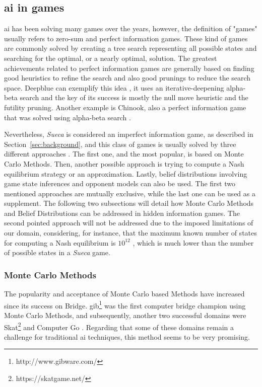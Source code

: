 \subsection{\gls{ai} in games}
 
\gls{ai} has been solving many games over the years, however, the definition of "games" usually refers to zero-sum and perfect information games.
These kind of games are commonly solved by creating a tree search representing all possible states and searching for the optimal, or a nearly optimal, solution.
The greatest achievements related to perfect information games are generally based on finding good heuristics to refine the search and also good prunings to reduce the search space.
Deepblue can exemplify this idea \cite{Campbell2002}, it uses an iterative-deepening alpha-beta search and the key of its success is mostly the null move heuristic and the futility pruning.
Another example is Chinook, also a perfect information game that was solved using alpha-beta search \cite{Schaeffer1996}.

Nevertheless, \emph{Sueca} is considered an imperfect information game, as described in Section~\ref{sec:background}, and this class of games is usually solved by three different approaches \cite{Cowling2012}.
The first one, and the most popular, is based on Monte Carlo Methods.
Then, another possible approach is trying to compute a Nash equilibrium strategy or an approximation.
Lastly, belief distributions involving game state inferences and opponent models can also be used.
The first two mentioned approaches are mutually exclusive, while the last one can be used as a supplement.
The following two subsections will detail how Monte Carlo Methods and Belief Distributions can be addressed in hidden information games.
The second pointed approach will not be addressed due to the imposed limitations of our domain, considering, for instance, that the maximum known number of states for computing a Nash equilibrium is $10^{12}$ \cite{Zinkevich}, which is much lower than the number of possible states in a \emph{Sueca} game.




\subsubsection{Monte Carlo Methods}

The popularity and acceptance of Monte Carlo based Methods have increased since its success on Bridge.
\gls{gib}\footnote{http://www.gibware.com/} was the first computer bridge champion using Monte Carlo Methods, and subsequently, another two successful domains were Skat\footnote{https://skatgame.net/} and Computer Go \cite{Gelly2011}.
Regarding that some of these domains remain a challenge for traditional \gls{ai} techniques, this method seems to be very promising.


